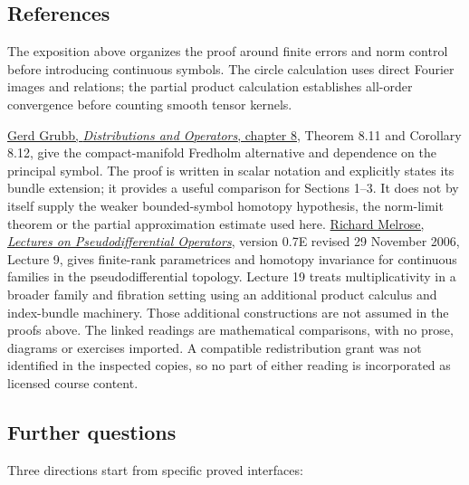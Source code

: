 \documentclass[
  11pt,
]{article}
\begin{document}
\subsection{References}\label{references}

The exposition above organizes the proof around finite errors and norm
control before introducing continuous symbols. The circle calculation
uses direct Fourier images and relations; the partial product
calculation establishes all-order convergence before counting smooth
tensor kernels.

\href{https://web.math.ku.dk/~grubb/dist8n.pdf}{Gerd Grubb,
\emph{Distributions and Operators}, chapter 8}, Theorem 8.11 and
Corollary 8.12, give the compact-manifold Fredholm alternative and
dependence on the principal symbol. The proof is written in scalar
notation and explicitly states its bundle extension; it provides a
useful comparison for Sections 1--3. It does not by itself supply the
weaker bounded-symbol homotopy hypothesis, the norm-limit theorem or the
partial approximation estimate used here.
\href{https://math.mit.edu/~rbm/18.157-F05.pdf}{Richard Melrose,
\emph{Lectures on Pseudodifferential Operators}}, version 0.7E revised
29 November 2006, Lecture 9, gives finite-rank parametrices and homotopy
invariance for continuous families in the pseudodifferential topology.
Lecture 19 treats multiplicativity in a broader family and fibration
setting using an additional product calculus and index-bundle machinery.
Those additional constructions are not assumed in the proofs above. The
linked readings are mathematical comparisons, with no prose, diagrams or
exercises imported. A compatible redistribution grant was not identified
in the inspected copies, so no part of either reading is incorporated as
licensed course content.

\subsection{Further questions}\label{further-questions}

Three directions start from specific proved interfaces:
\end{document}
